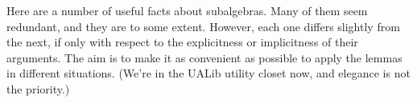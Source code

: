 Here are a number of useful facts about subalgebras. Many of them seem
redundant, and they are to some extent. However, each one differs
slightly from the next, if only with respect to the explicitness or
implicitness of their arguments. The aim is to make it as convenient as
possible to apply the lemmas in different situations. (We're in the
UALib utility closet now, and elegance is not the priority.)
\ccpad
\begin{code}%
\>[0]\AgdaSpace{}%
\AgdaModule{\AgdaUnderscore{}}\AgdaSpace{}%
\AgdaSymbol{\{}\AgdaSpace{}%
\AgdaSpace{}%
\AgdaSpace{}%
\AgdaSymbol{:}\AgdaSpace{}%
\AgdaSymbol{\}}\AgdaSpace{}%
\<%
\\
%
\\[\AgdaEmptyExtraSkip]%
\>[0][@{}l@{\AgdaIndent{0}}]%
\>[1]\<%
\\
%
\>[1]\AgdaSpace{}%
\AgdaSymbol{:}\AgdaSpace{}%
\AgdaSymbol{(}\AgdaSpace{}%
\AgdaSymbol{:}\AgdaSpace{}%
\AgdaSpace{}%
\AgdaSpace{}%
\AgdaSymbol{)(}\AgdaSpace{}%
\AgdaSymbol{:}\AgdaSpace{}%
\AgdaSpace{}%
\AgdaSpace{}%
\AgdaSymbol{)(}\AgdaSpace{}%
\AgdaSymbol{:}\AgdaSpace{}%
\AgdaSpace{}%
\AgdaSpace{}%
\AgdaSymbol{)}\<%
\\
\>[1][@{}l@{\AgdaIndent{0}}]%
\>[2]%
\>[11]\AgdaSpace{}%
\AgdaSpace{}%
%
\>[18]%
\>[21]\AgdaSpace{}%
\AgdaSpace{}%
\<%
\\
%
\>[11]\AgdaComment{----------------}\<%
\\
%
\>[2]%
\>[11]\AgdaSpace{}%
\AgdaSpace{}%
\<%
\\
%
\\[\AgdaEmptyExtraSkip]%
%
\>[1]\AgdaSpace{}%
\AgdaSpace{}%
\AgdaSpace{}%
\AgdaSpace{}%
\AgdaSpace{}%
\AgdaSpace{}%
\AgdaSymbol{=}\AgdaSpace{}%
\AgdaSymbol{(}\AgdaSpace{}%
\AgdaSpace{}%
\AgdaSpace{}%
\AgdaSpace{}%
\AgdaSpace{}%
\AgdaSpace{}%

\end{code}
